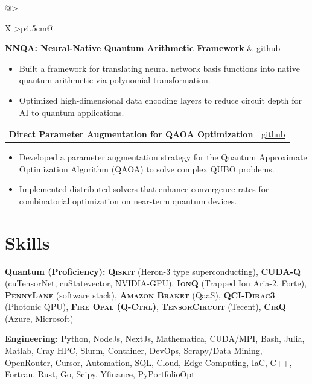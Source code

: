 \documentclass[10pt, letterpaper]{article}
\makeatletter
\newenvironment{highlights}{%
    \begin{itemize}[topsep=0.10cm, parsep=0.10cm, partopsep=0pt, itemsep=0pt,
                    leftmargin=10pt]
}{%
    \end{itemize}%
}
\newcommand{\datedentry}[2]{%
    \begin{tabularx}{\linewidth}{@{}>{\raggedright\arraybackslash}X
                                  >{\raggedleft\arraybackslash}p{4.5cm}@{}}
        #1 & #2
    \end{tabularx}%
}
\makeatother
\begin{document}
\vspace{0.2cm}
\datedentry{\textbf{NNQA: Neural-Native Quantum Arithmetic Framework}}{\href{https://github.com/gzquse/nnqa}{github}}
\begin{highlights}
\item Built a framework for translating neural network basis functions into
      native quantum arithmetic via polynomial transformation.
\item Optimized high-dimensional data encoding layers to reduce circuit depth
      for AI to quantum applications.
\end{highlights}

\vspace{0.2cm}
\datedentry{\textbf{Direct Parameter Augmentation for QAOA Optimization}}{\href{https://github.com/gzquse/DEAL_QUBO}{github}}
\begin{highlights}
\item Developed a parameter augmentation strategy for the Quantum Approximate
      Optimization Algorithm (QAOA) to solve complex QUBO problems.
\item Implemented distributed solvers that enhance convergence rates for
      combinatorial optimization on near-term quantum devices.
\end{highlights}

\section{Skills}

\textbf{Quantum (Proficiency):} \textbf{\textsc{Qiskit}} (Heron-3 type
superconducting), \textbf{CUDA-Q} (cuTensorNet, cuStatevector, NVIDIA-GPU),
\textbf{\textsc{IonQ}} (Trapped Ion Aria-2, Forte), \textbf{\textsc{PennyLane}}
(software stack), \textbf{\textsc{Amazon Braket}} (QaaS),
\textbf{QCI-\textsc{Dirac3}} (Photonic QPU),
\textbf{\textsc{Fire Opal} (Q-\textsc{Ctrl})}, \textbf{\textsc{TensorCircuit}}
(Tecent), \textbf{\textsc{CirQ}} (Azure, Microsoft)

\vspace{0.15cm}
\textbf{Engineering:} Python, NodeJs, NextJs, Mathematica, CUDA/MPI, Bash, Julia,
Matlab, Cray HPC, Slurm, Container, DevOps, Scrapy/Data Mining, OpenRouter,
Cursor, Automation, SQL, Cloud, Edge Computing, IaC, C++, Fortran, Rust, Go,
Scipy, Yfinance, PyPortfolioOpt
\end{document}
